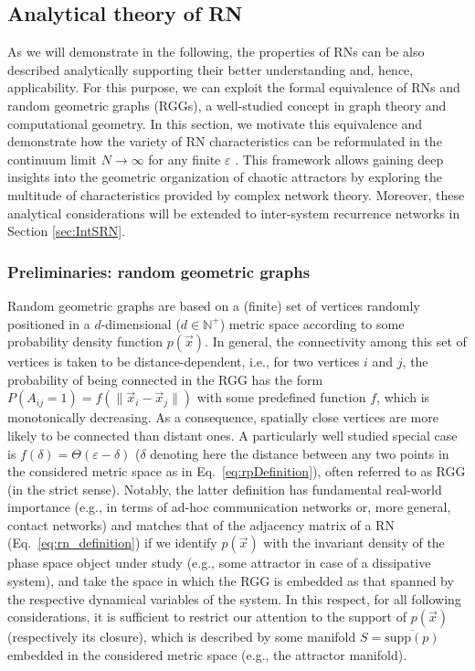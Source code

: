 	\subsection{Analytical theory of RN} \label{sec:analyticRNtheory}

	As we will demonstrate in the following, the properties of RNs can be also described analytically supporting their better understanding and, hence, applicability. For this purpose, we can exploit the formal equivalence of RNs and random geometric graphs (RGGs), a well-studied concept in graph theory and computational geometry. In this section, we motivate this equivalence and demonstrate how the variety of RN characteristics can be reformulated in the continuum limit $N\to\infty$ for any finite $\varepsilon$ \cite{Donges2012}. This framework allows gaining deep insights into the geometric organization of chaotic attractors by exploring the multitude of characteristics provided by complex network theory. Moreover, these analytical considerations will be extended to inter-system recurrence networks in Section \ref{sec:IntSRN}.


		\subsubsection{Preliminaries: random geometric graphs}
		Random geometric graphs \cite{Penrose2003} are based on a (finite) set of vertices randomly positioned in a $d$-dimensional ($d\in\mathbb{N}^+$) metric space according to some probability density function $p(\vec{x})$. In general, the connectivity among this set of vertices is taken to be distance-dependent, i.e., for two vertices $i$ and $j$, the probability of being connected in the RGG has the form $P(A_{ij}=1)=f(\|\vec{x}_i-\vec{x}_j\|)$ with some predefined function $f$, which is monotonically decreasing. As a consequence, spatially close vertices are more likely to be connected than distant ones. A particularly well studied special case is $f(\delta)=\Theta(\varepsilon-\delta)$ ($\delta$ denoting here the distance between any two points in the considered metric space as in Eq.~\eqref{eq:rpDefinition}), often referred to as RGG (in the strict sense). Notably, the latter definition has fundamental real-world importance (e.g., in terms of ad-hoc communication networks or, more general, contact networks) and matches that of the adjacency matrix of a RN (Eq.~\ref{eq:rn_definition}) if we identify $p(\vec{x})$ with the invariant density of the phase space object under study (e.g., some attractor in case of a dissipative system), and take the space in which the RGG is embedded as that spanned by the respective dynamical variables of the system. In this respect, for all following considerations, it is sufficient to restrict our attention to the support of $p(\vec{x})$ (respectively its closure), which is described by some manifold $S=\overline{\mbox{supp}(p)}$ embedded in the considered metric space (e.g., the attractor manifold).

